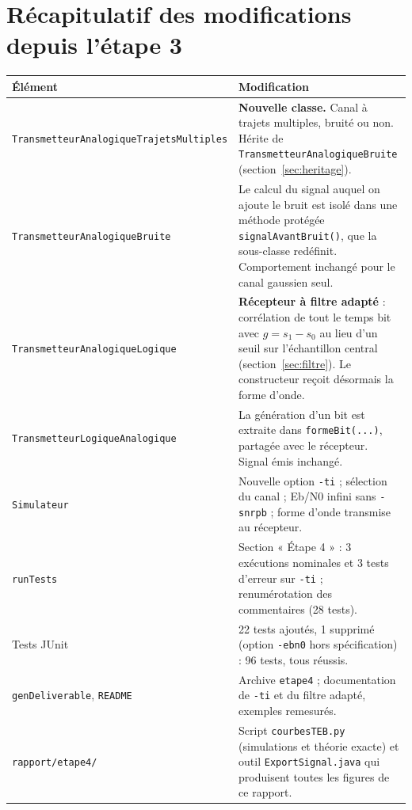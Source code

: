 \documentclass[11pt,a4paper]{article}
\newcommand{\cls}[1]{\texttt{#1}}
\begin{document}
\section{Récapitulatif des modifications depuis l'étape 3}
\begin{center}\small\begin{tabularx}{\linewidth}{>{\raggedright\arraybackslash}p{4.6cm}X}\toprule
Élément & Modification\\\midrule
\texttt{TransmetteurAnalogique}\newline\texttt{TrajetsMultiples} & \textbf{Nouvelle classe.} Canal à trajets multiples, bruité ou non. Hérite de \cls{TransmetteurAnalogiqueBruite} (section~\ref{sec:heritage}).\\
\texttt{TransmetteurAnalogique}\newline\texttt{Bruite} & Le calcul du signal auquel on ajoute le bruit est isolé dans une méthode protégée \texttt{signalAvantBruit()}, que la sous-classe redéfinit. Comportement inchangé pour le canal gaussien seul.\\
\texttt{TransmetteurAnalogique}\newline\texttt{Logique} & \textbf{Récepteur à filtre adapté} : corrélation de tout le temps bit avec $g = s_1 - s_0$ au lieu d'un seuil sur l'échantillon central (section~\ref{sec:filtre}). Le constructeur reçoit désormais la forme d'onde.\\
\texttt{TransmetteurLogique}\newline\texttt{Analogique} & La génération d'un bit est extraite dans \texttt{formeBit(...)}, partagée avec le récepteur. Signal émis inchangé.\\
\texttt{Simulateur} & Nouvelle option \texttt{-ti} ; sélection du canal ; Eb/N0 infini sans \texttt{-snrpb} ; forme d'onde transmise au récepteur.\\
\texttt{runTests} & Section « Étape 4 » : 3 exécutions nominales et 3 tests d'erreur sur \texttt{-ti} ; renumérotation des commentaires (28 tests).\\
Tests JUnit & 22 tests ajoutés, 1 supprimé (option \texttt{-ebn0} hors spécification) : 96 tests, tous réussis.\\
\texttt{genDeliverable}, \texttt{README} & Archive \texttt{etape4} ; documentation de \texttt{-ti} et du filtre adapté, exemples remesurés.\\
\texttt{rapport/etape4/} & Script \texttt{courbesTEB.py} (simulations et théorie exacte) et outil \texttt{ExportSignal.java} qui produisent toutes les figures de ce rapport.\\\bottomrule
\end{tabularx}\end{center}
\end{document}
